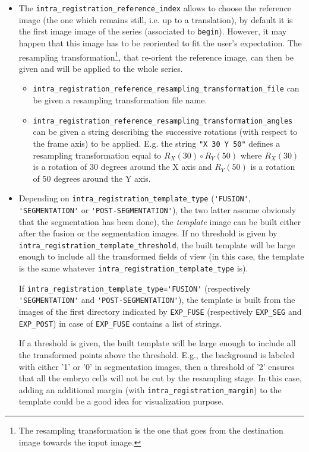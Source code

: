 \begin{itemize}
\itemsep -1ex

\item The \verb|intra_registration_reference_index| allows to choose the reference image (the one which remains still, i.e. up to a translation), by default it is the first image image of the series (associated to \verb|begin|). 
However, it may happen that this image has to be reoriented to fit the user's expectation. The resampling transformation\footnote{The resampling transformation is the one that goes from the destination image towards the input image.}, that re-orient the reference image, can then be given and will be applied to the whole series.
\begin{itemize}
\itemsep -1ex
\item \verb|intra_registration_reference_resampling_transformation_file| can be given a resampling transformation file name.
\item \verb|intra_registration_reference_resampling_transformation_angles| can be given a string describing the successive rotations (with respect to the frame axis) to be applied. E.g. the string \verb|"X 30 Y 50"| defines a resampling transformation equal to $R_X(30) \circ R_Y(50)$ where $R_X(30)$ is a rotation of 30 degrees around the X axis and $R_Y(50)$ is a rotation of 50 degrees around the Y axis.
\end{itemize}

\item Depending on \verb|intra_registration_template_type| (\verb|'FUSION'|,
\verb|'SEGMENTATION'| or \verb|'POST-SEGMENTATION'|), the two latter
assume obviously that the segmentation has been done), the
\textit{template} image can be built either after the fusion or the
segmentation images. If no threshold is given by
\verb|intra_registration_template_threshold|, the built template will
be large enough to include all the transformed fields of view (in this
case, the template is the same whatever
\verb|intra_registration_template_type| is).

If \verb|intra_registration_template_type='FUSION'| (respectively
\verb|'SEGMENTATION'| and \verb|'POST-SEGMENTATION'|),  the template
is built from the images of the first directory indicated by
\texttt{EXP\_FUSE} (respectively
\texttt{EXP\_SEG} and \texttt{EXP\_POST}) in case of
\texttt{EXP\_FUSE} contains a list of strings.

If a threshold is given, the built template will be large enough to
include all the transformed points above the threshold. E.g., the
background is labeled with either '1' or '0' in segmentation images,
then a threshold of '2' ensures that all the embryo cells will not be
cut by the resampling stage.  In this case, adding an additional
margin (with \verb|intra_registration_margin|) to the template could be a good idea for visualization
purpose. 


\end{itemize}
